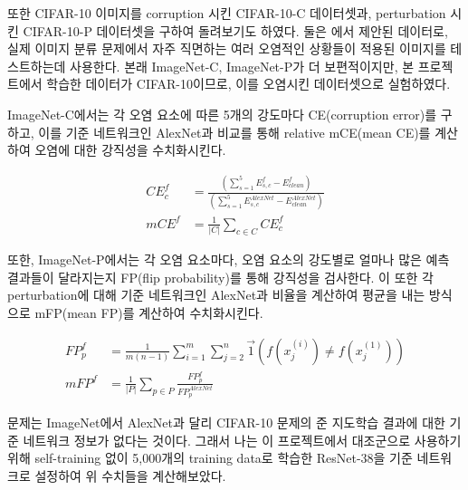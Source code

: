 또한 CIFAR-10 이미지를 corruption 시킨 CIFAR-10-C 데이터셋과, perturbation 시킨 CIFAR-10-P 데이터셋을 구하여 돌려보기도 하였다. 둘은 \cite{hendrycks2019benchmarking}에서 제안된 데이터로, 실제 이미지 분류 문제에서 자주 직면하는 여러 오염적인 상황들이 적용된 이미지를 테스트하는데 사용한다. 본래 ImageNet-C, ImageNet-P가 더 보편적이지만, 본 프로젝트에서 학습한 데이터가 CIFAR-10이므로, 이를 오염시킨 데이터셋으로 실험하였다.

ImageNet-C에서는 각 오염 요소에 따른 5개의 강도마다 CE(corruption error)를 구하고, 이를 기준 네트워크인 AlexNet과 비교를 통해 relative mCE(mean CE)를 계산하여 오염에 대한 강직성을 수치화시킨다. \cite{hendrycks2019benchmarking}

\begin{align*}
  CE_{c}^f &= \frac{\left( \sum_{s=1}^5 E_{s,c}^f - E_{clean}^f \right)}
  {\left( \sum_{s=1}^5 E_{s,c}^{AlexNet} - E_{clean}^{AlexNet} \right)} \\
  mCE^f &= \frac{1}{|C|} \sum_{c \in C} CE_{c}^f
\end{align*}

또한, ImageNet-P에서는 각 오염 요소마다, 오염 요소의 강도별로 얼마나 많은 예측 결과들이 달라지는지 FP(flip probability)를 통해 강직성을 검사한다. 이 또한 각 perturbation에 대해 기준 네트워크인 AlexNet과 비율을 계산하여 평균을 내는 방식으로 mFP(mean FP)를 계산하여 수치화시킨다. \cite{hendrycks2019benchmarking}

\begin{align*}
  FP_{p}^f &= \frac{1}{m(n-1)} \sum_{i=1}^m \sum_{j=2}^n \vec{1}
  \left( f(x_j^{(i)}) \neq f(x_j^{(1)}) \right) \\
  mFP^f &= \frac{1}{|P|} \sum_{p \in P} \frac{FP_p^f}{FP_p^{AlexNet}}
\end{align*}

문제는 ImageNet에서 AlexNet과 달리 CIFAR-10 문제의 준 지도학습 결과에 대한 기준 네트워크 정보가 없다는 것이다. 그래서 나는 이 프로젝트에서 대조군으로 사용하기 위해 self-training 없이 5,000개의 training data로 학습한 ResNet-38을 기준 네트워크로 설정하여 위 수치들을 계산해보았다.


